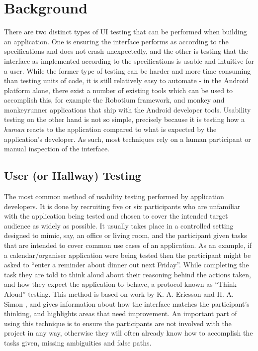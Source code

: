 \chapter{Background}

There are two distinct types of UI testing that can be performed when building
an application. One is ensuring the interface performs as according to the
specifications and does not crash unexpectedly, and the other is testing that
the interface as implemented according to the specifications is usable and
intuitive for a user. While the former type of testing can be harder and more
time consuming than testing units of code, it is still relatively easy to
automate - in the Android platform alone, there exist a number of existing
tools which can be used to accomplish this, for example the Robotium
\cite{robotium} framework, and monkey and monkeyrunner \cite{monkeyrunner}
applications that ship with the Android developer tools. Usability testing on
the other hand is not so simple, precisely because it is testing how
a \emph{human} reacts to the application compared to what is expected by the
application's developer. As such, most techniques rely on a human participant
or manual inspection of the interface.

\section{User (or Hallway) Testing}

The most common method of usability testing performed by application developers.
It is done by recruiting five or six participants who are unfamiliar with the
application being tested and chosen to cover the intended target audience as
widely as possible. It usually takes place in a controlled setting designed to
mimic, say, an office or living room, and the participant given tasks that are
intended to cover common use cases of an application. As an example, if
a calendar/organiser application were being tested then the participant might
be asked to ``enter a reminder about dinner out next Friday''. While completing
the task they are told to think aloud about their reasoning behind the actions
taken, and how they expect the application to behave, a protocol known as
``Think Aloud'' testing. This method is based on work by K. A. Ericsson and H.
A. Simon \cite{ericsson1980verbal}, and gives information about how the
interface matches the participant's thinking, and highlights areas that need
improvement. An important part of using this technique is to ensure the
participants are not involved with the project in any way, otherwise they will
often already know how to accomplish the tasks given, missing ambiguities and
false paths.

